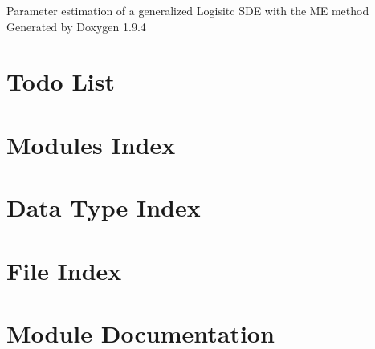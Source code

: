 \documentclass[twoside]{book}
\newcommand{\+}{\discretionary{\mbox{\scriptsize$\hookleftarrow$}}{}{}}
\newcommand{\clearemptydoublepage}{%
    \newpage{\pagestyle{empty}\cleardoublepage}%
  }
\begin{document}
  \raggedbottom
    \hypersetup{pageanchor=false,
                bookmarksnumbered=true,
                pdfencoding=unicode
               }
  \begin{titlepage}
  \vspace*{7cm}
  \begin{center}%
  {\Large Parameter  estimation of a generalized Logisitc SDE with the ME method}\\
  \vspace*{1cm}
  {\large Generated by Doxygen 1.9.4}\\
  \end{center}
  \end{titlepage}
  \clearemptydoublepage
  \tableofcontents
  \clearemptydoublepage
  \hypersetup{pageanchor=true}
\chapter{Todo List}
\label{todo}

\chapter{Modules Index}

\chapter{Data Type Index}

\chapter{File Index}

\chapter{Module Documentation}







\end{document}

